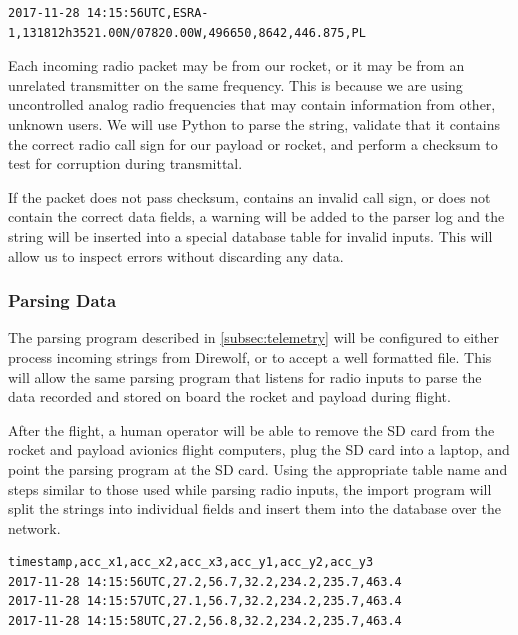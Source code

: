 \documentclass[onecolumn, draftclsnofoot, 10pt, compsoc]{IEEEtran}
\begin{document}
\begin{lstlisting}[frame=single]
2017-11-28 14:15:56UTC,ESRA-1,131812h3521.00N/07820.00W,496650,8642,446.875,PL
\end{lstlisting}
\label{example-aprs}

Each incoming radio packet may be from our rocket, or it may be from an unrelated transmitter on the same frequency.  This is because we are using uncontrolled analog radio frequencies that may contain information from other, unknown users.  We will use Python to parse the string, validate that it contains the correct radio call sign for our payload or rocket, and perform a checksum to test for corruption during transmittal.

If the packet does not pass checksum, contains an invalid call sign, or does not contain the correct data fields, a warning will be added to the parser log and the string will be inserted into a special database table for invalid inputs.  This will allow us to inspect errors without discarding any data.

\subsubsection{Parsing Data}

The parsing program described in \ref{subsec:telemetry} will be configured to either process incoming strings from Direwolf, or to accept a well formatted file.  This will allow the same parsing program that listens for radio inputs to parse the data recorded and stored on board the rocket and payload during flight.

After the flight, a human operator will be able to remove the SD card from the rocket and payload avionics flight computers, plug the SD card into a laptop, and point the parsing program at the SD card.  Using the appropriate table name and steps similar to those used while parsing radio inputs, the import program will split the strings into individual fields and insert them into the database over the network.\\

\begin{lstlisting}[frame=single]
timestamp,acc_x1,acc_x2,acc_x3,acc_y1,acc_y2,acc_y3
2017-11-28 14:15:56UTC,27.2,56.7,32.2,234.2,235.7,463.4
2017-11-28 14:15:57UTC,27.1,56.7,32.2,234.2,235.7,463.4
2017-11-28 14:15:58UTC,27.2,56.8,32.2,234.2,235.7,463.4
\end{lstlisting}
\label{example-file}
\end{document}
